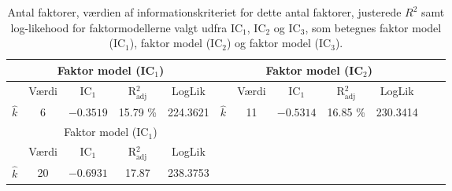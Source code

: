 
\begin{table}[h]
\center
\begin{tabular}{lcccc | lcccccc}
\toprule
\multicolumn{5}{c}{Faktor model (IC$_1$)} & \multicolumn{5}{c}{Faktor model (IC$_2$)} \\ \midrule
& Værdi &  IC$_1$ &  R$^2_{\text{adj}}$ & LogLik & & Værdi &  IC$_1$ &  R$^2_{\text{adj}}$ & LogLik \\
$\widehat{k}$ & 6 &  $-0.3519$ &  15.79 \% &  224.3621 & $\widehat{k}$ &11 & $-0.5314$ &  16.85 \% &  230.3414 \\\bottomrule \toprule
\multicolumn{5}{c}{Faktor model (IC$_1$)} \\ \cmidrule{1-5}
& Værdi &  IC$_1$ &  R$^2_{\text{adj}}$ & LogLik\\
$\widehat{k}$ & 20 & $-0.6931$ & 17.87 & 238.3753 \\ \cmidrule{1-5}
 \end{tabular}
 \caption{Antal faktorer, værdien af informationskriteriet for dette antal faktorer, justerede \(R^2\) samt log-likehood for faktormodellerne valgt udfra IC$_1$, IC$_2$ og IC$_3$, som betegnes faktor model (IC\(_1\)), faktor model (IC\(_2\)) og faktor model (IC\(_3\)).} \label{tab:est_faktor}
\end{table}
